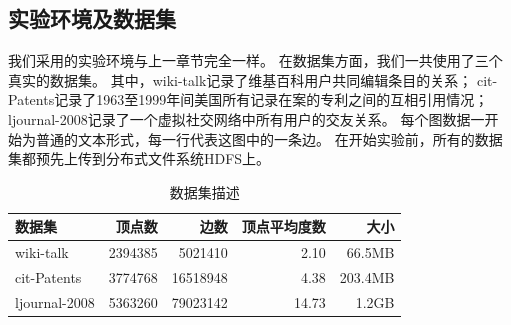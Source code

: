 \documentclass[master]{njuthesis}
\begin{document}
\subsection{实验环境及数据集}
我们采用的实验环境与上一章节完全一样。
在数据集方面，我们一共使用了三个真实的数据集。
其中，wiki-talk记录了维基百科用户共同编辑条目的关系；
cit-Patents记录了1963至1999年间美国所有记录在案的专利之间的互相引用情况；
ljournal-2008记录了一个虚拟社交网络中所有用户的交友关系。
每个图数据一开始为普通的文本形式，每一行代表这图中的一条边。
在开始实验前，所有的数据集都预先上传到分布式文件系统HDFS上。
\begin{table}[h]
\caption{数据集描述}
\label{tab:dataset1}
\centering
\begin{tabular}{|l|r|r|r|r|}
\hline
\textbf{数据集} & \textbf{顶点数} & \textbf{边数} & \textbf{顶点平均度数} & \textbf{大小} \\
\hline
wiki-talk     \footnotemark[1]       & \num{2394385} & \num{5021410}          &2.10                   & 66.5MB\\
\hline
cit-Patents      \footnotemark[2]     & \num{3774768}  & \num{16518948 }          & 4.38             & 203.4MB\\
\hline
ljournal-2008  \footnotemark[3] & \num{5363260} & \num{79023142}         & 14.73            &1.2GB\\
\hline
\end{tabular}
\end{table}
\end{document}
